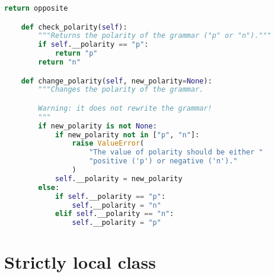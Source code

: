 \begin{lstlisting}[language=Python]
        return opposite

    def check_polarity(self):
        """Returns the polarity of the grammar ("p" or "n")."""
        if self.__polarity == "p":
            return "p"
        return "n"

    def change_polarity(self, new_polarity=None):
        """Changes the polarity of the grammar.

        Warning: it does not rewrite the grammar!
        """
        if new_polarity is not None:
            if new_polarity not in ["p", "n"]:
                raise ValueError(
                    "The value of polarity should be either "
                    "positive ('p') or negative ('n')."
                )
            self.__polarity = new_polarity
        else:
            if self.__polarity == "p":
                self.__polarity = "n"
            elif self.__polarity == "n":
                self.__polarity = "p"
\end{lstlisting}

\section{Strictly local class}

